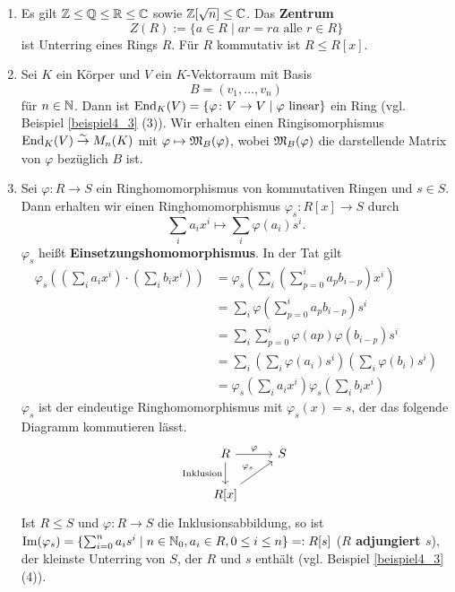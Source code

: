 \begin{beispiel}\label{beispiel4_6}
	\begin{enumerate}[label=(\arabic*)]
		\item Es gilt $\mathbb{Z} \leq \mathbb{Q} \leq \mathbb{R} \leq \mathbb{C}$ sowie $\mathbb{Z}[\sqrt{n}] \leq \mathbb{C}$. Das \textbf{Zentrum} 
		\[Z(R) := \{a \in R \mid ar=ra \text{ alle } r \in R\}\]
		ist Unterring eines Rings $R$. Für $R$ kommutativ ist $R \leq R[x]$.
		\item Sei $K$ ein Körper und $V$ ein $K$-Vektorraum mit Basis
		\[B = (v_1, \dots, v_n)\]
		für $n \in \mathbb{N}$. Dann ist $\mathrm{End}_K(V) = \{\varphi\colon V \to V \mid \varphi \text{ linear}\}$ ein Ring (vgl. Beispiel \ref{beispiel4_3} (3)). Wir erhalten einen Ringisomorphismus $\mathrm{End}_K(V) \overset{\sim}{\to} M_n(K)$ mit $\varphi \mapsto \mathfrak{M}_B(\varphi)$, wobei $\mathfrak{M}_B(\varphi)$ die darstellende Matrix von $\varphi$ bezüglich $B$ ist.
		\item Sei $\varphi \colon R \to S$ ein Ringhomomorphismus von kommutativen Ringen und $s \in S$. Dann erhalten wir einen Ringhomomorphismus $\varphi_s \colon R[x] \to S$ durch 
		\[\sum_i a_i x^i \mapsto \sum_i \varphi(a_i)s^i.\]
		$\varphi_s$ heißt \textbf{Einsetzungshomomorphismus}. In der Tat gilt 
		\begin{align*}
			\varphi_s\left( \left(\sum_i a_i x^i\right) \cdot \left(\sum_i b_i x^i\right)\right) &= \varphi_s\left(\sum_i \left(\sum_{p=0}^i a_p b_{i-p}\right)x^i\right)\\
			&= \sum_i \varphi\left(\sum_{p=0}^i a_p b_{i-p}\right) s^i\\
			&= \sum_i \sum_{p=0}^i \varphi(ap)\varphi(b_{i-p}) s^i\\
			&= \sum_i \left(\sum_i \varphi(a_i) s^i\right) \left(\sum_{i} \varphi(b_i) s^i\right)\\
			&= \varphi_s\left(\sum_i a_ix^i\right) \varphi_s\left(\sum_i b_ix^i\right)
		\end{align*}
		$\varphi_s$ ist der eindeutige Ringhomomorphismus mit $\varphi_s(x) = s$, der das folgende Diagramm kommutieren lässt.
		\[
		\begin{tikzcd}
			R \arrow{r}{\varphi} \arrow[swap]{d}{\text{Inklusion}} & S \\
			R[x] \arrow{ur}{\varphi_s}
		\end{tikzcd}
		\]
		Ist $R \leq S$ und $\varphi \colon R \to S$ die Inklusionsabbildung, so ist  $\mathrm{Im}(\varphi_s) = \{\sum_{i=0}^n a_i s^i \mid n \in \mathbb{N}_0, a_i \in R, 0 \leq i \leq n\} =: R[s]$ (\glqq\textbf{$R$ adjungiert $s$}\grqq), der kleinste Unterring von $S$, der $R$ und $s$ enthält (vgl. Beispiel \ref{beispiel4_3} (4)). 
		\vspace{0.5cm}
		

\end{enumerate}
\end{beispiel}
